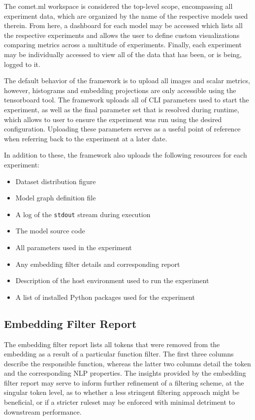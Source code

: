 \documentclass[../../fyp.tex]{subfiles}
\begin{document}
The comet.ml workspace is considered the top-level scope, encompassing all experiment data, which are organized by the name of the respective models used therein. From here, a dashboard for each model may be accessed which lists all the respective experiments and allows the user to define custom visualizations comparing metrics across a multitude of experiments. Finally, each experiment may be individually accessed to view all of the data that has been, or is being, logged to it.

The default behavior of the framework is to upload all images and scalar metrics, however, histograms and embedding projections are only accessible using the tensorboard tool. The framework uploads all of CLI parameters used to start the experiment, as well as the final parameter set that is resolved during runtime, which allows to user to ensure the experiment was run using the desired configuration. Uploading these parameters serves as a useful point of reference when referring back to the experiment at a later date. 

In addition to these, the framework also uploads the following resources for each experiment:
\begin{itemize}
\item Dataset distribution figure
\item Model graph definition file
\item A log of the \texttt{stdout} stream during execution
\item The model source code
\item All parameters used in the experiment
\item Any embedding filter details and corresponding report
\item Description of the host environment used to run the experiment 
\item A list of installed Python packages used for the experiment
\end{itemize}

\subsection{Embedding Filter Report}
The embedding filter report lists all tokens that were removed from the embedding as a result of a particular function filter. The first three columns describe the responsible function, whereas the latter two columns detail the token and the corresponding NLP properties. The insights provided by the embedding filter report may serve to inform further refinement of a filtering scheme, at the singular token level, as to whether a less stringent filtering approach might be beneficial, or if a stricter ruleset may be enforced with minimal detriment to downstream performance. 
\end{document}
